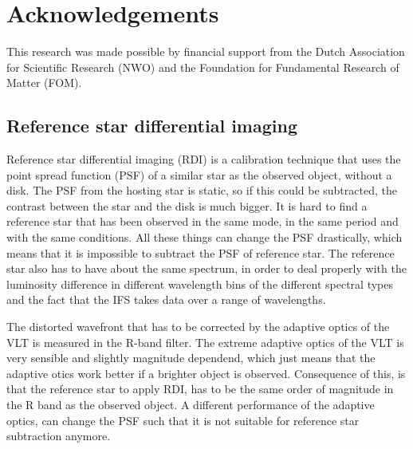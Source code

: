 \documentclass[twoside,single]{lion-msc}
\begin{document}


%
%

\section*{Acknowledgements}
\small
This research was made possible by financial support from the Dutch Association for Scientific Research (NWO) and the Foundation for Fundamental Research of Matter (FOM).








\clearpage
\subsection*{Reference star differential imaging}
Reference star differential imaging (RDI) is a calibration technique that uses the point spread function (PSF) of a similar star as the observed object, without a disk. The PSF from the hosting star is static, so if this could be subtracted, the contrast between the star and the disk is much bigger. It is hard to find a reference star that has been observed in the same mode, in the same period and with the same conditions. All these things can change the PSF drastically, which means that it is impossible to subtract the PSF of reference star. The reference star also has to have about the same spectrum, in order to deal properly with the luminosity difference in different wavelength bins of the different spectral types and the fact that the IFS takes data over a range of wavelengths. 
\bigskip

The distorted wavefront that has to be corrected by the adaptive optics of the VLT is measured in the R-band filter. The extreme adaptive optics of the VLT is very sensible and slightly magnitude dependend, which just means that the adaptive otics work better if a brighter object is observed. Consequence of this, is that the reference star to apply RDI, has to be the same order of magnitude in the R band as the observed object. A different performance of the adaptive optics, can change the PSF such that it is not suitable for reference star subtraction anymore. 
\end{document}
